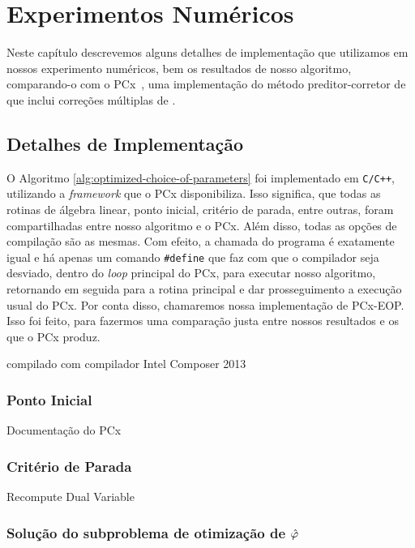 \chapter{Experimentos Numéricos}
\label{chap:numerical}

Neste capítulo descrevemos alguns detalhes de implementação que utilizamos em nossos experimento numéricos, bem os resultados de nosso algoritmo, comparando-o com o  PCx~\cite{Czyzyk:1999hk}, uma implementação do método preditor-corretor de \textcite{Mehrotra:1992wr} que inclui correções múltiplas de \textcite{Gondzio:1996uw}. 



\section{Detalhes de Implementação}

O Algoritmo \ref{alg:optimized-choice-of-parameters} foi implementado em  \texttt{C/C++}, utilizando a \emph{framework} que o PCx disponibiliza. Isso significa, que todas as rotinas de álgebra linear, ponto inicial, critério de parada, entre outras, foram compartilhadas entre nosso algoritmo e o PCx. Além disso, todas as opções de compilação são as mesmas. Com efeito, a chamada do programa é exatamente igual e há apenas um comando \texttt{\#define} que faz com que o compilador seja desviado, dentro do \emph{loop} principal do PCx, para executar nosso algoritmo, retornando em seguida para a rotina principal e dar prosseguimento a execução usual do PCx.
Por conta disso, chamaremos nossa implementação de PCx-EOP. Isso foi feito, para fazermos uma comparação justa entre nossos resultados e os que o PCx produz. 



compilado com  compilador Intel  Composer 2013


\subsection{Ponto Inicial}

Documentação do PCx

\subsection{Critério de Parada}

Recompute Dual Variable

\subsection{Solução do subproblema de otimização \texorpdfstring{de $\hat{\varphi}$}{da função de mérito}}


